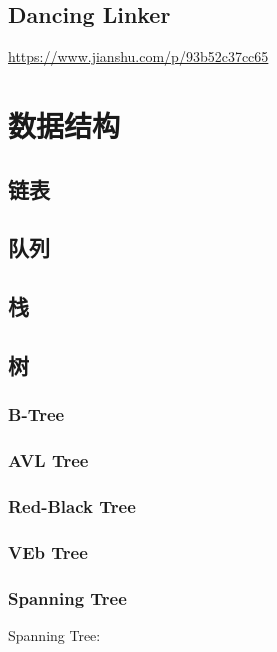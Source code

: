 \documentclass[12pt]{article}  %
\begin{document}
\subsection{Dancing Linker}

\url{https://www.jianshu.com/p/93b52c37cc65}

\section{数据结构}

\subsection{链表}

\subsection{队列}

\subsection{栈}

\subsection{树}

\subsubsection{B-Tree}

\subsubsection{AVL Tree}

\subsubsection{Red-Black Tree}

\subsubsection{VEb Tree}

\subsubsection{Spanning Tree}

Spanning Tree:
\end{document}
